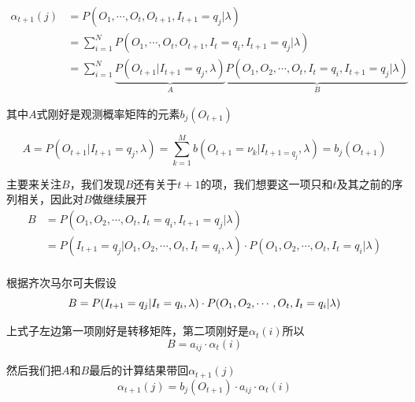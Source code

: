 \begin{mdframed}[linewidth=0pt,backgroundcolor=gray!10]

    \begin{equation}
        \begin{aligned}
            \alpha_{t+1}(j)&=P(O_1,\cdots,O_t,O_{t+1},I_{t+1}=q_j|\lambda)\\
            &=\sum\limits_{i=1}^{N}P(O_1,\cdots,O_t,O_{t+1},I_{t}=q_i,I_{t+1}=q_j|\lambda)\\
            &=\sum\limits_{i=1}^{N}\underbrace{P(O_{t+1}|I_{t+1}=q_j,\lambda)}_{A}\underbrace{P(O_{1},O_{2},\cdots,O_{t},I_t=q_i,I_{t+1}=q_j|\lambda)}_{B}
        \end{aligned}
    \end{equation}

    其中$A$式刚好是观测概率矩阵的元素$b_j(O_{t+1})$

    \begin{equation}
        A=P(O_{t+1}|I_{t+1}=q_j,\lambda)=\sum_{k=1}^{M}b(O_{t+1}=\nu_k|I_{t+1=q_j},\lambda)=b_j(O_{t+1})
    \end{equation}

    主要来关注$B$，我们发现$B$还有关于$t+1$的项，我们想要这一项只和$t$及其之前的序列相关，因此对$B$做继续展开
    \begin{equation}
        \begin{aligned}
            B&=P(O_{1},O_{2},\cdots,O_{t},I_t=q_i,I_{t+1}=q_j|\lambda)\\
            &=P(I_{t+1}=q_j|O_{1},O_{2},\cdots,O_{t},I_t=q_i,\lambda)\cdot P(O_{1},O_{2},\cdots,O_{t},I_t=q_i|\lambda)\\
        \end{aligned}
    \end{equation}

    根据齐次马尔可夫假设
    \begin{equation}
        B=P(I_{t+1}=q_j|I_t=q_i,\lambda)\cdot P(O_{1},O_{2},\cdots,O_{t},I_t=q_i|\lambda)\\
    \end{equation}

    上式子左边第一项刚好是转移矩阵，第二项刚好是$\alpha_t(i)$所以
    \begin{equation}
        B=a_{ij}\cdot \alpha_t(i)
    \end{equation}

    然后我们把$A$和$B$最后的计算结果带回$\alpha_{t+1}(j)$
        \begin{equation}
            \alpha_{t+1}(j)=b_j(O_{t+1})\cdot a_{ij}\cdot \alpha_t(i)
        \end{equation}

\end{mdframed}

